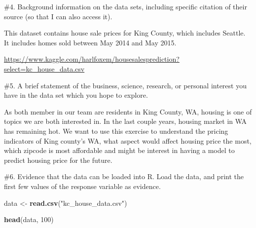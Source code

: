 \documentclass[
]{article}
\newenvironment{Shaded}{\begin{snugshade}}{\end{snugshade}}
\newcommand{\DecValTok}[1]{\textcolor[rgb]{0.00,0.00,0.81}{#1}}
\newcommand{\KeywordTok}[1]{\textcolor[rgb]{0.13,0.29,0.53}{\textbf{#1}}}
\newcommand{\NormalTok}[1]{#1}
\newcommand{\StringTok}[1]{\textcolor[rgb]{0.31,0.60,0.02}{#1}}
\begin{document}
\#4. Background information on the data sets, including specific
citation of their source (so that I can also access it).

This dataset contains house sale prices for King County, which includes
Seattle. It includes homes sold between May 2014 and May 2015.

\url{https://www.kaggle.com/harlfoxem/housesalesprediction?select=kc_house_data.csv}

\#5. A brief statement of the business, science, research, or personal
interest you have in the data set which you hope to explore.

As both member in our team are residents in King County, WA, housing is
one of topics we are both interested in. In the last couple years,
housing market in WA has remaining hot. We want to use this exercise to
understand the pricing indicators of King county's WA, what aspect would
affect housing price the most, which zipcode is most affordable and
might be interest in having a model to predict housing price for the
future.

\#6. Evidence that the data can be loaded into R. Load the data, and
print the first few values of the response variable as evidence.

\begin{Shaded}
\begin{Highlighting}[]
\NormalTok{data <-}\StringTok{  }\KeywordTok{read.csv}\NormalTok{(}\StringTok{"kc_house_data.csv"}\NormalTok{)}

\KeywordTok{head}\NormalTok{(data, }\DecValTok{100}\NormalTok{)}
\end{Highlighting}
\end{Shaded}
\end{document}
